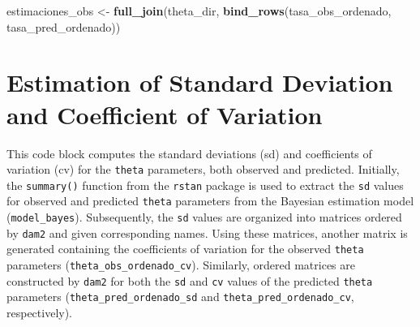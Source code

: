 \documentclass[
  12pt,
]{book}
\newenvironment{Shaded}{\begin{snugshade}}{\end{snugshade}}
\newcommand{\FunctionTok}[1]{\textcolor[rgb]{0.13,0.29,0.53}{\textbf{#1}}}
\newcommand{\NormalTok}[1]{#1}
\newcommand{\OtherTok}[1]{\textcolor[rgb]{0.56,0.35,0.01}{#1}}
\begin{document}
\begin{Shaded}
\begin{Highlighting}[]
\NormalTok{estimaciones\_obs }\OtherTok{\textless{}{-}} \FunctionTok{full\_join}\NormalTok{(theta\_dir,}
                              \FunctionTok{bind\_rows}\NormalTok{(tasa\_obs\_ordenado, tasa\_pred\_ordenado))}
\end{Highlighting}
\end{Shaded}

\hypertarget{estimation-of-standard-deviation-and-coefficient-of-variation}{%
\section{Estimation of Standard Deviation and Coefficient of Variation}\label{estimation-of-standard-deviation-and-coefficient-of-variation}}

This code block computes the standard deviations (sd) and coefficients of variation (cv) for the \texttt{theta} parameters, both observed and predicted. Initially, the \texttt{summary()} function from the \texttt{rstan} package is used to extract the \texttt{sd} values for observed and predicted \texttt{theta} parameters from the Bayesian estimation model (\texttt{model\_bayes}). Subsequently, the \texttt{sd} values are organized into matrices ordered by \texttt{dam2} and given corresponding names. Using these matrices, another matrix is generated containing the coefficients of variation for the observed \texttt{theta} parameters (\texttt{theta\_obs\_ordenado\_cv}). Similarly, ordered matrices are constructed by \texttt{dam2} for both the \texttt{sd} and \texttt{cv} values of the predicted \texttt{theta} parameters (\texttt{theta\_pred\_ordenado\_sd} and \texttt{theta\_pred\_ordenado\_cv}, respectively).
\end{document}
